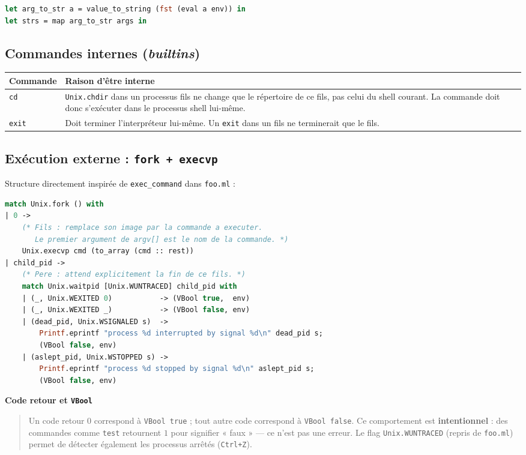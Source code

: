 \documentclass[11pt,a4paper]{article}
\newenvironment{bloc}[1]
{
  \par\medskip
  \noindent\textbf{#1}
  \par
  \smallskip
  \begin{quote}
}
{
  \end{quote}
  \medskip
}
\begin{document}
\begin{lstlisting}[language=ml]
let arg_to_str a = value_to_string (fst (eval a env)) in
let strs = map arg_to_str args in
\end{lstlisting}

\subsection{Commandes internes (\textit{builtins})}

\begin{longtable}{|p{3cm}|p{9cm}|}
\hline
\textbf{Commande} & \textbf{Raison d'être interne} \\
\hline
\texttt{cd} & \texttt{Unix.chdir} dans un processus fils ne change
              que le répertoire de ce fils, pas celui du shell courant.
              La commande doit donc s'exécuter dans le processus shell lui-même. \\
\hline
\texttt{exit} & Doit terminer l'interpréteur lui-même.
                Un \texttt{exit} dans un fils ne terminerait que le fils. \\
\hline
\end{longtable}

\subsection{Exécution externe : \texttt{fork + execvp}}

Structure directement inspirée de \texttt{exec\_command} dans \texttt{foo.ml} :

\begin{lstlisting}[language=ml]
match Unix.fork () with
| 0 ->
    (* Fils : remplace son image par la commande a executer.
       Le premier argument de argv[] est le nom de la commande. *)
    Unix.execvp cmd (to_array (cmd :: rest))
| child_pid ->
    (* Pere : attend explicitement la fin de ce fils. *)
    match Unix.waitpid [Unix.WUNTRACED] child_pid with
    | (_, Unix.WEXITED 0)           -> (VBool true,  env)
    | (_, Unix.WEXITED _)           -> (VBool false, env)
    | (dead_pid, Unix.WSIGNALED s)  ->
        Printf.eprintf "process %d interrupted by signal %d\n" dead_pid s;
        (VBool false, env)
    | (aslept_pid, Unix.WSTOPPED s) ->
        Printf.eprintf "process %d stopped by signal %d\n" aslept_pid s;
        (VBool false, env)
\end{lstlisting}

\begin{bloc}{Code retour et \texttt{VBool}}
Un code retour $0$ correspond à \texttt{VBool true} ;
tout autre code correspond à \texttt{VBool false}.
Ce comportement est \textbf{intentionnel} : des commandes comme \texttt{test}
retournent $1$ pour signifier « faux » --- ce n'est pas une erreur.
Le flag \texttt{Unix.WUNTRACED} (repris de \texttt{foo.ml}) permet de
détecter également les processus arrêtés (\texttt{Ctrl+Z}).
\end{bloc}
\end{document}
